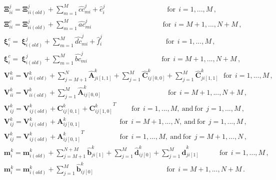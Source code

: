 \begin{align}
& \boldsymbol{\Xi}_{ii}^{j} = \boldsymbol{\Xi}_{ii(old)}^{j} + \sum_{m=1}^{M}\hat{cc}_{mi}^{j} + \hat{e}_{i}^{j} \ \ \ \ \ \ \ \ \ \ \ \ \ \ \ \ \ \ \ \ \ \ \ \ \ \ \ \ \ \ \ \ \ \ \ \ \ \ \ \ \textrm{for}\ \ i = 1,...,M\,, \nonumber \\
& \boldsymbol{\Xi}_{ii}^{c} = \boldsymbol{\Xi}_{ii(old)}^{j} + \sum_{m=1}^{M}\hat{ac}_{mi}^{j} \ \ \ \ \ \ \ \ \ \ \ \ \ \ \ \ \ \ \ \ \ \ \ \ \ \ \ \ \ \ \ \ \ \ \ \ \ \ \ \ \ \ \ \ \ \ \textrm{for}\ \ i = M+1,...,N+M\,, \nonumber \\
& \boldsymbol{\xi}_{i}^{c} = \ \boldsymbol{\xi}_{i(old)}^{j} + \sum_{m=1}^{M}\hat{dc}_{mi}^{j} + \hat{f}_{i}^{j} \ \ \ \ \ \ \ \ \ \ \ \ \ \ \ \ \ \ \ \ \ \ \ \ \ \ \ \ \ \ \ \ \ \ \ \ \ \ \ \ \ \textrm{for}\ \ i = 1,...,M\,, \nonumber \\
& \boldsymbol{\xi}_{i}^{c} = \ \boldsymbol{\xi}_{i(old)}^{j} +  \sum_{m=1}^{M}\hat{bc}_{mi}^{j} \ \ \ \ \ \ \ \ \ \ \ \ \ \ \ \ \ \  \ \ \ \ \ \ \ \ \ \ \ \ \ \ \ \ \ \ \ \ \ \ \ \ \ \ \ \ \ \  \textrm{for}\ \ i = M+1,...,N+M\,, \nonumber \\
& \boldsymbol{V}_{ii}^{k} = \boldsymbol{V}_{ii(old)}^{k} +  \sum_{j=M+1}^{N}\hat{\boldsymbol{A}}_{ji[1,1]}^{k} + \sum_{j=1}^{M}\hat{\boldsymbol{C}}_{ij[0,0]}^{k} + \sum_{j=1}^{M}\hat{\boldsymbol{C}}_{ji[1,1]}^{k} \ \ \  \textrm{for}\ \ i = 1,...,M\,, \nonumber \\
& \boldsymbol{V}_{ii}^{k} = \boldsymbol{V}_{ii(old)}^{k} +   \sum_{j=1}^{M}\hat{\boldsymbol{A}}_{ij[0,0]}^{k} \ \ \ \ \ \ \ \ \ \ \ \ \ \ \ \ \ \ \ \ \ \ \ \ \ \ \ \ \ \ \ \ \ \ \ \ \ \ \ \ \ \ \ \textrm{for}\ \ i = M+1,...,N+M\,, \nonumber \\
& \boldsymbol{V}_{ij}^{k} = \boldsymbol{V}_{ij(old)}^{k} + \boldsymbol{C}_{ij[0,1]}^{k} + {\boldsymbol{C}_{ij[1,0]}^{k}}^T \ \ \ \ \ \ \ \ \ \ \textrm{for}\ \ i = 1,...,M,\ \textrm{and}\ \textrm{for}\ \ j = 1,...,M\,, \nonumber \\
& \boldsymbol{V}_{ij}^{k} = \boldsymbol{V}_{ij(old)}^{k} + \boldsymbol{A}_{ij[0,1]}^{k} \ \ \ \ \ \ \ \ \ \ \ \  \ \ \ \ \ \ \ \ \ \ \ \ \ \textrm{for}\ \ i = M+1,...,N,\ \textrm{and}\ \textrm{for}\ \ j = 1,...,M\,, \nonumber \\
& \boldsymbol{V}_{ij}^{k} = \boldsymbol{V}_{ij(old)}^{k} + {\boldsymbol{A}_{ij[0,1]}^{k}}^T \ \ \ \ \ \ \ \ \ \ \ \ \ \ \ \ \ \ \ \ \ \ \ \textrm{for}\ \ i = 1,...,M,\ \textrm{and}\ \textrm{for}\ \ j = M+1,...,N\,, \nonumber \\
& \boldsymbol{m}_{i}^{k} = \boldsymbol{m}_{i(old)}^{k} +  \sum_{j=M+1}^{N+M}\hat{\boldsymbol{b}}_{ji[1]}^{k} + \sum_{j=1}^{M}\hat{\boldsymbol{d}}_{ij[0]}^{k} + \sum_{j=1}^{M}\hat{\boldsymbol{d}}_{ji[1]}^{k} \ \ \ \ \ \ \ \ \ \ \ \ \ \textrm{for}\ \ i = 1,...,M\,, \nonumber \\
& \boldsymbol{m}_{i}^{k} = \boldsymbol{m}_{i(old)}^{k} + \sum_{j=1}^{M}\hat{\boldsymbol{b}}_{ij[0]}^{k} \ \ \ \ \ \ \ \ \ \ \ \ \ \ \ \ \ \ \ \ \ \ \ \ \ \ \ \ \ \ \ \ \ \ \ \ \ \ \ \ \ \ \ \ \ \ \ \textrm{for}\ \ i = M+1,...,N+M\,. \nonumber \\
\end{align}
